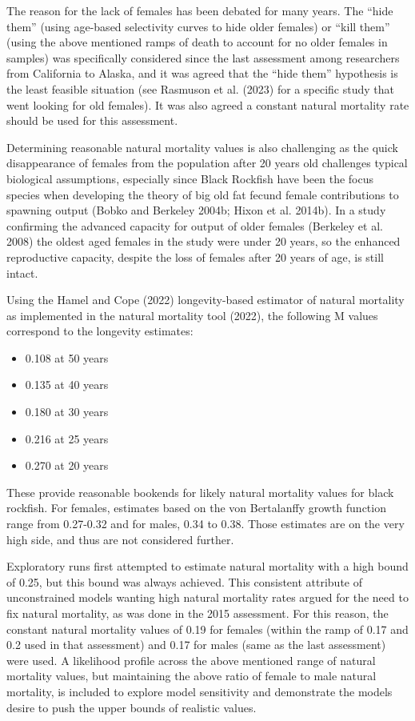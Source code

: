 \documentclass[11pt,
  english,
  letterpaper,
]{article}
\providecommand{\tightlist}{%
  \setlength{\itemsep}{0pt}\setlength{\parskip}{0pt}}
\providecommand{\tightlist}{%
  \setlength{\itemsep}{0pt}\setlength{\parskip}{0pt}}
\begin{document}
The reason for the lack of females has been debated for many years. The ``hide them'' (using age-based selectivity curves to hide older females) or ``kill them'' (using the above mentioned ramps of death to account for no older females in samples) was specifically considered since the last assessment among researchers from California to Alaska, and it was agreed that the ``hide them'' hypothesis is the least feasible situation (see Rasmuson et al. (2023) for a specific study that went looking for old females). It was also agreed a constant natural mortality rate should be used for this assessment.

Determining reasonable natural mortality values is also challenging as the quick disappearance of females from the population after 20 years old challenges typical biological assumptions, especially since Black Rockfish have been the focus species when developing the theory of big old fat fecund female contributions to spawning output (Bobko and Berkeley 2004b; Hixon et al. 2014b). In a study confirming the advanced capacity for output of older females (Berkeley et al. 2008) the oldest aged females in the study were under 20 years, so the enhanced reproductive capacity, despite the loss of females after 20 years of age, is still intact.

Using the Hamel and Cope (2022) longevity-based estimator of natural mortality as implemented in the natural mortality tool (2022), the following M values correspond to the longevity estimates:

\begin{itemize}
\tightlist
\item
  0.108 at 50 years
\item
  0.135 at 40 years
\item
  0.180 at 30 years
\item
  0.216 at 25 years
\item
  0.270 at 20 years
\end{itemize}

These provide reasonable bookends for likely natural mortality values for black rockfish. For females, estimates based on the von Bertalanffy growth function range from 0.27-0.32 and for males, 0.34 to 0.38. Those estimates are on the very high side, and thus are not considered further.

Exploratory runs first attempted to estimate natural mortality with a high bound of 0.25, but this bound was always achieved. This consistent attribute of unconstrained models wanting high natural mortality rates argued for the need to fix natural mortality, as was done in the 2015 assessment. For this reason, the constant natural mortality values of 0.19 for females (within the ramp of 0.17 and 0.2 used in that assessment) and 0.17 for males (same as the last assessment) were used. A likelihood profile across the above mentioned range of natural mortality values, but maintaining the above ratio of female to male natural mortality, is included to explore model sensitivity and demonstrate the models desire to push the upper bounds of realistic values.
\end{document}
